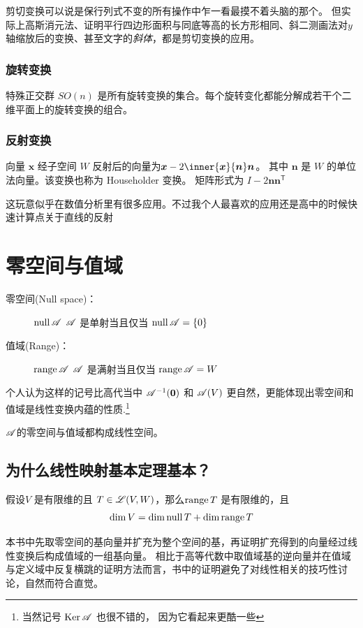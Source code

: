 剪切变换可以说是保行列式不变的所有操作中乍一看最摸不着头脑的那个。
但实际上高斯消元法、证明平行四边形面积与同底等高的长方形相同、斜二测画法对\(y\)轴缩放后的变换、甚至文字的\emph{斜体}，都是剪切变换的应用。

\subsubsection{旋转变换}
特殊正交群 \(SO(n)\) 是所有旋转变换的集合。每个旋转变化都能分解成若干个二维平面上的旋转变换的组合。
\subsubsection{反射变换}
向量 \(\bm{x}\) 经子空间 \(W\) 反射后的向量为\(\bm{x} - 2\inner{\bm{x}}{\bm{n}}\bm{n}\)。
其中 \(\bm{n}\) 是 \(W\) 的单位法向量。该变换也称为 Householder 变换。
矩阵形式为 \(I - 2\bm{n} \bm{n}^{\mathsf{T}}\)

这玩意似乎在数值分析里有很多应用。不过我个人最喜欢的应用还是高中的时候快速计算点关于直线的反射

\section{零空间与值域}
\begin{description}
    \item[零空间(Null space)：] \(\operatorname{null} \mathscr{A}\)
        \(\mathscr{A}\) 是单射当且仅当
        \(\operatorname{null} \mathscr{A} = \{0\}\)
    \item[值域(Range)：] \(\operatorname{range} \mathscr{A}\)
        \(\mathscr{A}\) 是满射当且仅当
        \(\operatorname{range} \mathscr{A} = W\)
\end{description}
个人认为这样的记号比高代当中 \(\mathscr{A}^{-1}(\bm{0})\) 和 \(\mathscr{A}(V)\)
更自然，更能体现出零空间和值域是线性变换内蕴的性质.\footnote{当然记号
    \(\operatorname{Ker} \mathscr{A}\) 也很不错的，
因为它看起来更酷一些 }

\(\mathscr{A}\)的零空间与值域都构成线性空间。

\subsection{为什么线性映射基本定理基本？}

\begin{theorem}[线性映射基本定理]
    假设\(V\) 是有限维的且 \(T \in \mathscr{L}(V,W)\)，那么\(\operatorname{range}
    T\) 是有限维的，且\[
        \dim V = \dim \operatorname{null} T + \dim \operatorname{range} T
    \]
\end{theorem}
本书中先取零空间的基向量并扩充为整个空间的基，再证明扩充得到的向量经过线性变换后构成值域的一组基向量。
相比于高等代数中取值域基的逆向量并在值域与定义域中反复横跳的证明方法而言，书中的证明避免了对线性相关的技巧性讨论，自然而符合直觉。

